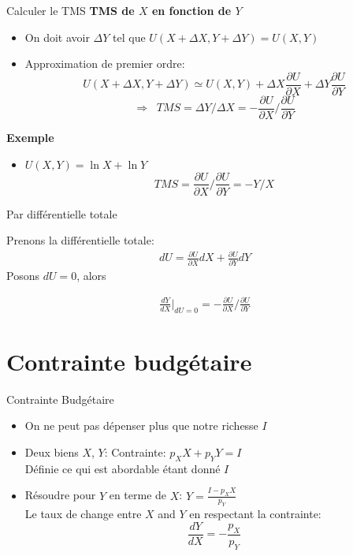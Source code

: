\documentclass[handout]{beamer}
\begin{document}
\begin{frame}{Calculer le TMS}
\textbf{TMS de $X$ en fonction de $Y$} \pause
\begin{itemize}
\item On doit avoir $\Delta Y$ tel que $U(X + \Delta X, Y + \Delta Y) = U(X,Y)$
\item Approximation de premier ordre: $$U(X+\Delta X, Y+ \Delta Y) \simeq  U(X,Y)+  \Delta X  \frac{\partial U}{\partial X} + \Delta Y \frac{\partial U}{\partial Y}$$\pause
$$ \Rightarrow \;\; TMS = \Delta Y/ \Delta X =  -\frac{\partial U}{\partial X}/ \frac{\partial U}{\partial Y}$$
\end{itemize}

\textbf{Exemple}
\begin{itemize}
\item $U(X,Y) = \ln X + \ln Y$
 $$TMS = \frac{\partial U}{\partial X}/ \frac{\partial U}{\partial Y} = -Y/X$$
\end{itemize}

\end{frame}

\begin{frame}{Par différentielle totale}

Prenons la différentielle totale:
\begin{align}
dU = \frac{\partial U}{\partial X}dX + \frac{\partial U}{\partial Y}dY
\end{align}
Posons $dU = 0$, alors 

\begin{align}
\frac{dY}{dX}\bigg\rvert_{dU=0} = -\frac{\partial U}{\partial X}/ \frac{\partial U}{\partial Y}
\end{align}

\end{frame}


\section{Contrainte budgétaire}

\begin{frame}{Contrainte Budgétaire}
\begin{itemize}
\item On ne peut pas dépenser plus que notre richesse $I$
\item Deux biens $X$, $Y$:  Contrainte: $p_X X + p_Y Y = I$ \\ Définie ce qui est abordable étant donné $I$\\
\item Résoudre pour $Y$ en terme de  $X$:     $Y = \frac{I - p_X X}{p_Y}$\\
Le taux de change entre $X$ and $Y$ en respectant la contrainte: $$\frac{dY}{dX} = -\frac{p_X}{p_Y}$$
\end{itemize}

\end{frame}
\end{document}
